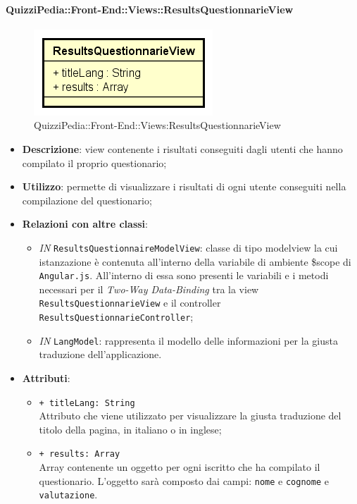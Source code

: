 \paragraph{QuizziPedia::Front-End::Views::ResultsQuestionnarieView}
\begin{figure} [ht]
	\centering
	\includegraphics[scale=0.45]{UML/Classi/Front-End/QuizziPedia_Front-end_ResultsQuestionnarieView.png}
	\caption{QuizziPedia::Front-End::Views:ResultsQuestionnarieView}
\end{figure} \FloatBarrier
\begin{itemize}
	\item \textbf{Descrizione}: view contenente i risultati conseguiti dagli utenti che hanno compilato il proprio questionario;
	\item \textbf{Utilizzo}: permette di visualizzare i risultati di ogni utente conseguiti nella compilazione del questionario;
	\item \textbf{Relazioni con altre classi}:
	\begin{itemize}
		\item \textit{IN} \texttt{ResultsQuestionnaireModelView}: classe di tipo modelview la cui istanzazione è contenuta all'interno della variabile di ambiente \$scope di \texttt{Angular.js}. All'interno di essa sono presenti le variabili e i metodi necessari per il \textit{Two-Way Data-Binding} tra la view \texttt{ResultsQuestionnarieView} e il controller \texttt{ResultsQuestionnarieController}; 
		\item \textit{IN} \texttt{LangModel}: rappresenta il modello delle informazioni per la giusta traduzione dell'applicazione.
	\end{itemize}
	\item \textbf{Attributi}:
	\begin{itemize}
		\item \texttt{+ titleLang: String} \\ Attributo che viene utilizzato per visualizzare la giusta traduzione del titolo della pagina, in italiano o in inglese; 
		\item \texttt{+ results: Array} \\ Array contenente un oggetto per ogni iscritto che ha compilato il questionario. L'oggetto sarà composto dai campi: \texttt{nome} e \texttt{cognome} e \texttt{valutazione}.
	\end{itemize}
\end{itemize}